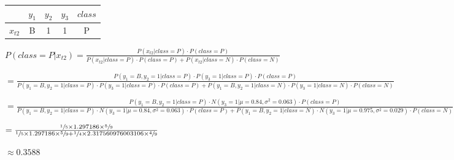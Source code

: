 \documentclass[11pt,a4paper]{article}
\begin{document}
\begin{flushleft}
\vspace{6mm}\begin{tabular}{c|c|c|c|c|}
  \cline{2-5}
                                 & $y_1$ & $y_2$ & $y_3$ & $class$ \\ \hline
  \multicolumn{1}{|c|}{$x_{t2}$} & B     & 1     & 1     & P       \\ \hline
\end{tabular} \par
  \vspace{3.5mm}\small $ P(class = P | x_{t2}) = \frac{P(x_{t2} | class = P) \cdot P(class = P)}{P(x_{t2} | class = P) \cdot P(class = P) + P(x_{t2} | class = N) \cdot P(class = N)} $ \par
  \vspace{2mm}\footnotesize $ = \frac{P(y_1 = B, y_2 = 1 | class = P) \cdot P(y_3 = 1 | class = P) \cdot P(class = P)}{{P(y_1 = B, y_2 = 1 | class = P) \cdot P(y_3 = 1 | class = P) \cdot P(class = P) + P(y_1 = B, y_2 = 1 | class = N) \cdot P(y_3 = 1 | class = N) \cdot P(class = N)}} $ \par
  \vspace{2mm}\footnotesize $ = \frac{P(y_1 = B, y_2 = 1 | class = P) \cdot N(y_3 = 1 | \mu = 0.84, \sigma^2 = 0.063) \cdot P(class = P)}{P(y_1 = B, y_2 = 1 | class = P) \cdot N(y_3 = 1 | \mu = 0.84, \sigma^2 = 0.063) \cdot P(class = P) + P(y_1 = B, y_2 = 1 | class = N) \cdot N(y_3 = 1 | \mu = 0.975, \sigma^2 = 0.029) \cdot P(class = N)} $ \par
  \vspace{2mm}\small $ = \frac{\sfrac{1}{5} \times 1.297186 \times \sfrac{5}{9}}{\sfrac{1}{5} \times 1.297186 \times \sfrac{5}{9} + \sfrac{1}{4} \times 2.317560976003106 \times \sfrac{4}{9}} $ \par
  \vspace{2.5mm}\small $ \approx 0.3588 $ \par


\end{flushleft}
\end{document}

